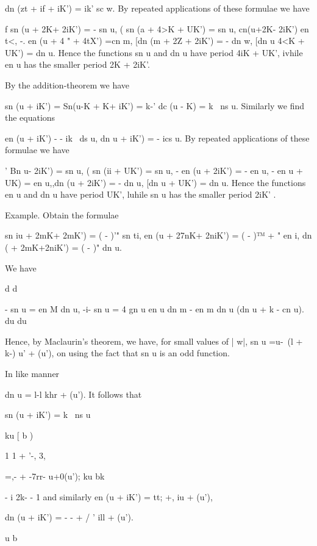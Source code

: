 dn (zt + if + iK') = ik' sc w. By repeated applications of these
formulae we have

f sn (u + 2K+ 2iK') = - sn u, ( sn (a + 4>K + UK') = sn u, cn(u+2K-
2iK') en t<, -. en (u + 4 " + 4tX') =cn m, [dn (m + 2Z + 2iK') = - dn
w, [dn u 4<K + UK') = dn u. Hence the functions sn u and dn u have
period 4iK + UK', ivhile en u has the smaller period 2K + 2iK'.


By the addition-theorem we have

sn (u + iK') = Sn(u-K + K+ iK') = k-' dc (u - K) = k~ ns u. Similarly
we find the equations

en (u + iK') - - ik~ ds u, dn u + iK') = - ics u. By repeated
applications of these formulae we have

' Bn u- 2iK') = sn u, ( sn (ii + UK') = sn u, - en (u + 2iK') = - en
u, - en u + UK) = en u,,dn (u + 2iK') = - dn u, [dn u + UK') = dn u.
Hence the functions en u and dn u have period UK', luhile sn u has the
smaller period 2iK' .

Example. Obtain the formulae

sn iu + 2mK+ 2mK') = ( - )'" sn ti, en (u + 27nK+ 2niK') = ( - )™ + "
en i, dn ( + 2mK+2niK') = ( - )" dn u.


We have

d d

- sn u = en M dn u, -i- sn u = 4 gn u en u dn m - en m dn u (dn u + k
- cn u). du du

%
%

Hence, by Maclaurin's theorem, we have, for small values of | w|, sn u
=u-~(l + k-) u' + (u'), on using the fact that sn u is an odd
function.

In like manner

dn u = l-l khr + (u'). It follows that

sn (u + iK') = k~ ns u

ku [ b )

1 1 + '-, 3,

=,- + -7rr- u+0(u'); ku bk

- i 2k- - 1 and similarly en (u + iK') = tt; +, iu + (u'),

dn (u + iK') = - - + / ' ill + (u').

u b

